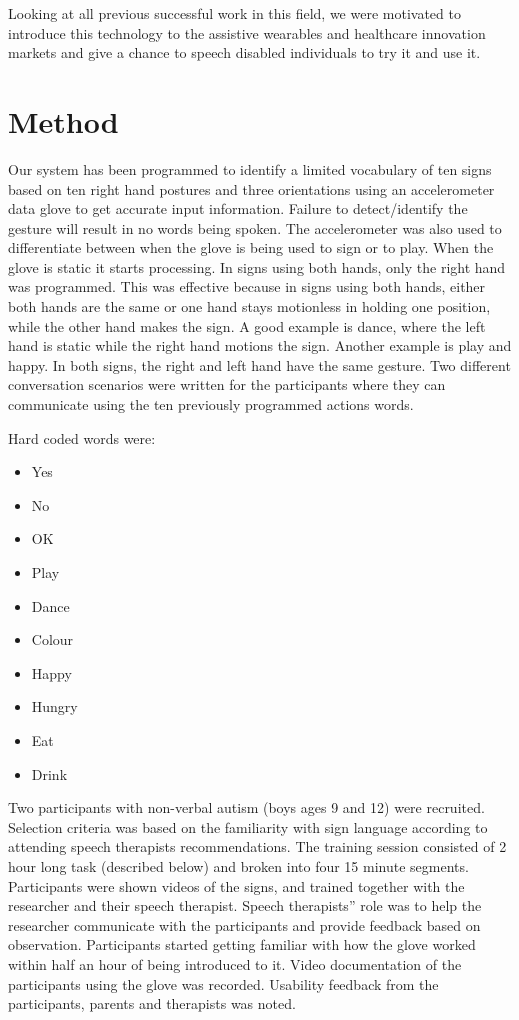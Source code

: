 Looking at all previous successful work in this field, we were motivated to introduce this technology to the assistive wearables and healthcare innovation markets and give a chance to speech disabled individuals to try it and use it. 

\section{Method}

Our system has been programmed to identify a limited vocabulary of ten signs based on ten right hand postures and three orientations using an accelerometer data glove to get accurate input information. Failure to detect/identify the gesture will result in no words being spoken. The accelerometer was also used to differentiate between when the glove is being used to sign or to play. When the glove is static it starts processing. In signs using both hands, only the right hand was programmed. This was effective because in signs using both hands, either both hands are the same or one hand stays motionless in holding one position, while the other hand makes the sign. A good example is dance, where the left hand is static while the right hand motions the sign. Another example is play and happy. In both signs, the right and left hand have the same gesture. Two different conversation scenarios were written for the participants where they can communicate using the ten previously programmed actions words. 

Hard coded words were: 

\begin{itemize}
  \item Yes
  \item No
  \item OK
  \item Play
  \item Dance
  \item Colour
  \item Happy
  \item Hungry
  \item Eat
  \item Drink
\end{itemize}

Two participants with non-verbal autism (boys ages 9 and 12) were recruited. Selection criteria was based on the familiarity with sign language according to attending speech therapists recommendations. The training session consisted of 2 hour long task (described below) and broken into four 15 minute segments. Participants were shown videos of the signs, and trained together with the researcher and their speech therapist. Speech therapists'' role was to help the researcher communicate with the participants and provide feedback based on observation. Participants started getting familiar with how the glove worked within half an hour of being introduced to it. Video documentation of the participants using the glove was recorded. Usability feedback from the participants, parents and therapists was noted. 

